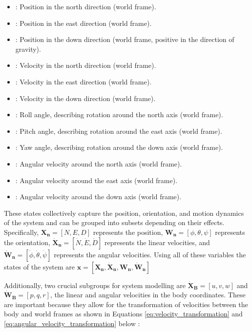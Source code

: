 \documentclass{UoNMCHA}
\numberwithin{equation}{section}
\begin{document}
\begin{itemize}
    \item {}: Position in the north direction (world frame).
    \item {}: Position in the east direction (world frame).
    \item {}: Position in the down direction (world frame, positive in the direction of gravity).
    \item {}: Velocity in the north direction (world frame).
    \item {}: Velocity in the east direction (world frame).
    \item {}: Velocity in the down direction (world frame).
    \item \text{\(\phi\)}: Roll angle, describing rotation around the north axis (world frame).
    \item \text{\(\theta\)}: Pitch angle, describing rotation around the east axis (world frame).
    \item \text{\(\psi\)}: Yaw angle, describing rotation around the down axis (world frame).
    \item \text{\(\dot{\phi}\)}: Angular velocity around the north axis (world frame).
    \item \text{\(\dot{\theta}\)}: Angular velocity around the east axis (world frame).
    \item \text{\(\dot{\psi}\)}: Angular velocity around the down axis (world frame).
\end{itemize}

These states collectively capture the position, orientation, and motion dynamics of the system and can be grouped into subsets depending on their effects. Specifically, \(\mathbf{X_n} = [N, E, D]\) represents the position, \(\mathbf{W_n} = [\phi, \theta, \psi]\) represents the orientation, \(\mathbf{\dot{X}_n} = [\dot{N}, \dot{E}, \dot{D}]\) represents the linear velocities, and \(\mathbf{\dot{W}_n} = [\dot{\phi}, \dot{\theta}, \dot{\psi}]\) represents the angular velocities. Using all of these variables the states of the system are \(\mathbf{x} = [\mathbf{X_n}, \mathbf{\dot{X}_n}, \mathbf{W_n}, \mathbf{\dot{W}_n}]\)

Additionally, two crucial subgroups for system modelling are \(\mathbf{\dot{X}_B} = [u, v, w]\) and \(\mathbf{\dot{W}_B} = [p, q, r]\), the linear and angular velocities in the body coordinates. These are important because they allow for the transformation of velocities between the body and world frames as shown in Equations \ref{eq:velocity_transformation} and \ref{eq:angular_velocity_transformation} below \cite{HindawiDynamcis}:
\end{document}
